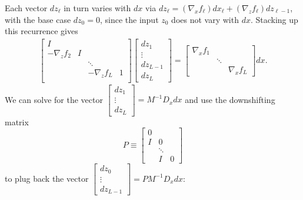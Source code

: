 \documentclass{article}
\begin{document}
Each vector $dz_\ell$ in turn varies with $dx$ via $dz_\ell = (\nabla_x f_\ell) dx_\ell + (\nabla_z f_\ell)
    dz_{\ell-1}$, with the base case $dz_0 = 0$, since the input $z_0$ does not vary with $dx$. Stacking up this recurrence
gives
\begin{align}
    \begin{bmatrix}
        I             &   &                   \\
        -\nabla_z f_2 & I &                   \\
                      &   & \ddots            \\
                      &   & -\nabla_z f_L & 1 \\
    \end{bmatrix}
    \begin{bmatrix}
        dz_1 \\ \vdots \\ dz_{L-1}  \\ dz_L
    \end{bmatrix}
    =
    \begin{bmatrix}
        \nabla_x f_1 &        &              \\
                     & \ddots &              \\
                     &        & \nabla_x f_L
    \end{bmatrix}
    dx.
\end{align}
We can solve for the vector $\begin{bmatrix}
        dz_1 \\ \vdots \\ dz_L
    \end{bmatrix}
    = M^{-1} D_x dx$ and use the downshifting matrix
\begin{equation}
    P \equiv \begin{bmatrix}
        0 \\ I & 0 \\ &\ddots \\ &I&0
    \end{bmatrix}
\end{equation}
to plug back the vector $\begin{bmatrix}
        dz_0 \\ \vdots \\ dz_{L-1}
    \end{bmatrix}
    =PM^{-1}D_x dx$:
\end{document}
